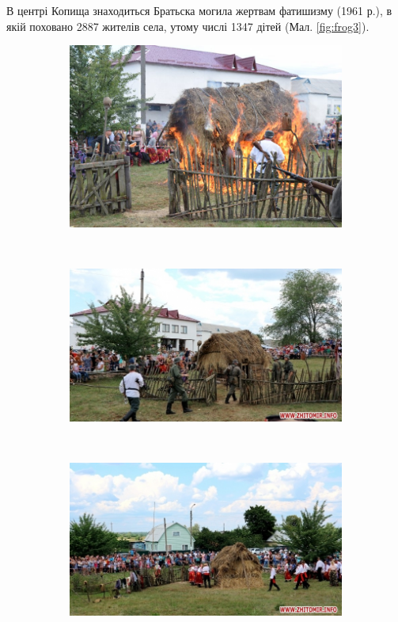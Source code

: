 В центрі Копища знаходиться Братьска могила жертвам фатишизму (1961 р.), в якій поховано 2887 жителів села, утому числі 1347 дітей (Мал. \ref{fig:frog3}).
\begin{figure}
	\centering
	\begin{subfigure}[b]{0.3\textwidth}
		\includegraphics[width=\textwidth]{1.jpg}
		\caption{}
		\label{fig:gull}
	\end{subfigure}
	~ %
	\begin{subfigure}[b]{0.3\textwidth}
		\includegraphics[width=\textwidth]{2.jpg}
		\caption{}
		\label{fig:tiger}
	\end{subfigure}
	~ %
	\begin{subfigure}[b]{0.3\textwidth}
		\includegraphics[width=\textwidth]{3.jpg}

\end{subfigure}
\end{figure}
